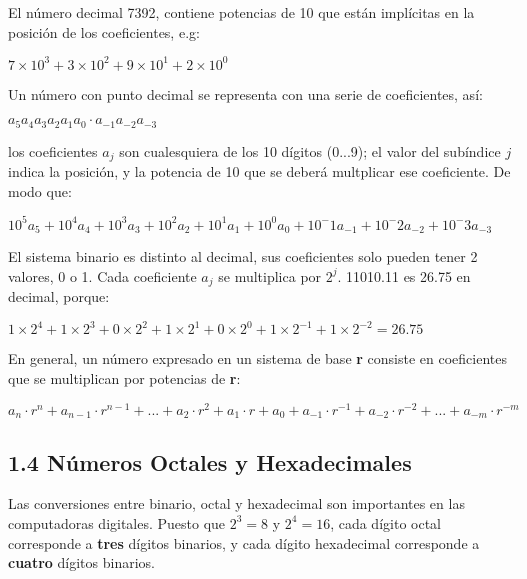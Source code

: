\documentclass{article}
\begin{document}
El n\'{u}mero decimal 7392, contiene potencias de 10 que est\'{a}n
impl\'{i}citas en la posici\'{o}n de los coeficientes, e.g:
\medskip

\begin{center}
    $7 \times 10^3 + 3 \times 10^2 + 9 \times 10^1 + 2 \times 10^0$
\end{center}

Un n\'{u}mero con punto decimal se representa con una serie de 
coeficientes, as\'{i}:

\begin{center}
    \large
    $a_5a_4a_3a_2a_1a_0 \cdot a_{-1}a_{-2}a_{-3}$
\end{center}

los coeficientes $a_j$ son cualesquiera de los 10 d\'{i}gitos (0...9);
el valor del sub\'{i}ndice $j$ indica la posici\'{o}n, y la potencia de
10 que se deber\'{a} multplicar ese coeficiente. De modo que:

\begin{center}
    $10^5a_5 + 10^4a_4 + 10^3a_3 + 10^2a_2 + 10^1a_1 + 10^0a_0
     + 10^-1a_{-1} + 10^-2a_{-2} + 10^-3a_{-3}$
\end{center}

El sistema binario es distinto al decimal, sus coeficientes solo pueden
tener 2 valores, 0 o 1. Cada coeficiente $a_j$ se multiplica por $2^j$.
11010.11 es 26.75 en decimal, porque:

\begin{center}
    $1 \times 2^4 + 1 \times 2^3 + 0 \times 2^2 + 1 \times 2^1 + 0 \times 2^0
     + 1 \times 2^{-1} + 1 \times 2^{-2} = 26.75$
\end{center}

En general, un n\'{u}mero expresado en un sistema de base \textbf{r} consiste
en coeficientes que se multiplican por potencias de \textbf{r}:

\begin{center}
    $a_n \cdot r^n + a_{n-1} \cdot r^{n-1} +...+ a_2 \cdot r^2 + a_1 \cdot r 
     + a_0 + a_{-1} \cdot r^{-1} + a_{-2} \cdot r^{-2} +...+ a_{-m} \cdot r^{-m}$
\end{center}

\subsection*{1.4 N\'{u}meros Octales y Hexadecimales}

Las conversiones entre binario, octal y hexadecimal son importantes en las 
computadoras digitales. Puesto que $2^3 = 8$ y $2^4 = 16$, cada d\'{i}gito
octal corresponde a \textbf{tres} d\'{i}gitos binarios, y cada d\'{i}gito
hexadecimal corresponde a \textbf{cuatro} d\'{i}gitos binarios.
\end{document}
